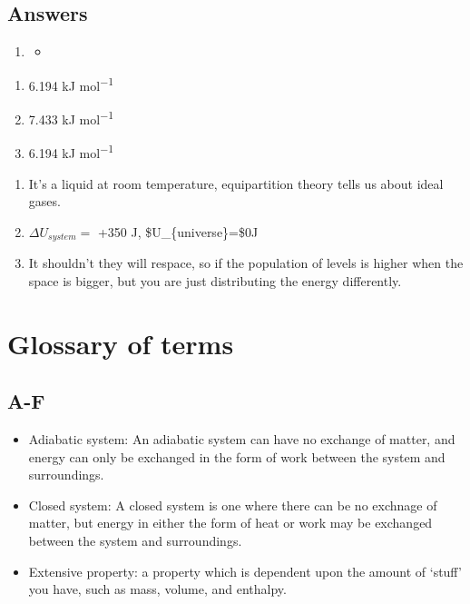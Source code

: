 \documentclass[
]{book}
\providecommand{\tightlist}{%
  \setlength{\itemsep}{0pt}\setlength{\parskip}{0pt}}
\begin{document}
\hypertarget{answers}{%
\section{Answers}\label{answers}}

\begin{enumerate}
\def\labelenumi{\arabic{enumi}.}
\item
  \begin{itemize}
  \item
  \end{itemize}
\end{enumerate}

\begin{enumerate}
\def\labelenumi{\alph{enumi}.}
\tightlist
\item
  6.194 kJ mol\textsuperscript{−1}
\item
  7.433 kJ mol\textsuperscript{−1}
\item
  6.194 kJ mol\textsuperscript{−1}
\end{enumerate}

\begin{enumerate}
\def\labelenumi{\arabic{enumi}.}
\setcounter{enumi}{1}
\item
  It's a liquid at room temperature, equipartition theory tells us about ideal gases.
\item
  \(\Delta U_{system}=\) +350 J, \$\Delta U\_\{universe\}=\$0J
\item
  It shouldn't they will respace, so if the population of levels is higher when the space is bigger, but you are just distributing the energy differently.
\end{enumerate}

\hypertarget{glossary-of-terms}{%
\chapter*{Glossary of terms}\label{glossary-of-terms}}

\hypertarget{a-f}{%
\section*{A-F}\label{a-f}}

\begin{itemize}
\item
  Adiabatic system: An adiabatic system can have no exchange of matter, and energy can only be exchanged in the form of work between the system and surroundings.
\item
  Closed system: A closed system is one where there can be no exchnage of matter, but energy in either the form of heat or work may be exchanged between the system and surroundings.
\item
  Extensive property: a property which is dependent upon the amount of `stuff' you have, such as mass, volume, and enthalpy.
\end{itemize}
\end{document}
